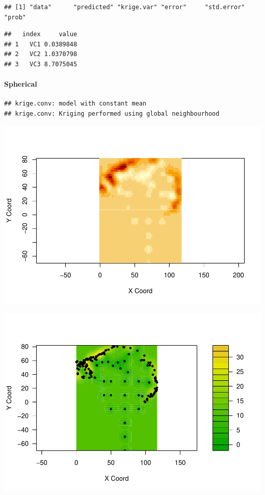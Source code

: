 \documentclass[
]{article}
\begin{document}
\begin{verbatim}
## [1] "data"      "predicted" "krige.var" "error"     "std.error" "prob"
\end{verbatim}

\begin{verbatim}
##   index     value
## 1   VC1 0.0389848
## 2   VC2 1.0370798
## 3   VC3 8.7075045
\end{verbatim}

\hypertarget{spherical-2}{%
\paragraph{Spherical}\label{spherical-2}}

\begin{verbatim}
## krige.conv: model with constant mean
## krige.conv: Kriging performed using global neighbourhood
\end{verbatim}

\includegraphics{Assignment_1_files/figure-latex/unnamed-chunk-50-1.pdf}

\includegraphics{Assignment_1_files/figure-latex/unnamed-chunk-51-1.pdf}
\end{document}
